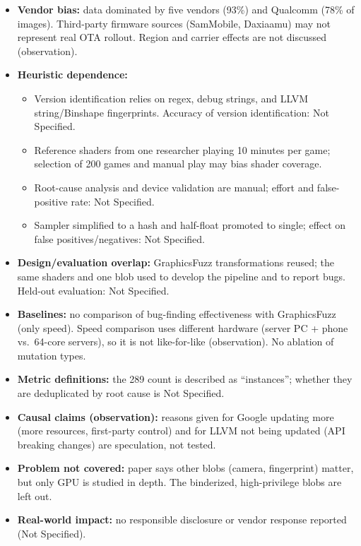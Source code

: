 \documentclass[11pt,a4paper]{article}
\begin{document}
\begin{enumerate}
\begin{itemize}[leftmargin=*, itemsep=1pt, topsep=2pt]
        \item \textbf{Vendor bias:} data dominated by five vendors (93\%) and Qualcomm (78\% of images). Third-party firmware sources (SamMobile, Daxiaamu) may not represent real OTA rollout. Region and carrier effects are not discussed (observation).
        \item \textbf{Heuristic dependence:}
        \begin{itemize}[itemsep=0pt]
            \item Version identification relies on regex, debug strings, and LLVM string/Binshape fingerprints. Accuracy of version identification: Not Specified.
            \item Reference shaders from one researcher playing 10 minutes per game; selection of 200 games and manual play may bias shader coverage.
            \item Root-cause analysis and device validation are manual; effort and false-positive rate: Not Specified.
            \item Sampler simplified to a hash and half-float promoted to single; effect on false positives/negatives: Not Specified.
        \end{itemize}
        \item \textbf{Design/evaluation overlap:} GraphicsFuzz transformations reused; the same shaders and one blob used to develop the pipeline and to report bugs. Held-out evaluation: Not Specified.
        \item \textbf{Baselines:} no comparison of bug-finding effectiveness with GraphicsFuzz (only speed). Speed comparison uses different hardware (server PC + phone vs.\ 64-core servers), so it is not like-for-like (observation). No ablation of mutation types.
        \item \textbf{Metric definitions:} the 289 count is described as ``instances''; whether they are deduplicated by root cause is Not Specified.
        \item \textbf{Causal claims (observation):} reasons given for Google updating more (more resources, first-party control) and for LLVM not being updated (API breaking changes) are speculation, not tested.
        \item \textbf{Problem not covered:} paper says other blobs (camera, fingerprint) matter, but only GPU is studied in depth. The binderized, high-privilege blobs are left out.
        \item \textbf{Real-world impact:} no responsible disclosure or vendor response reported (Not Specified).
    \end{itemize}


\end{enumerate}
\end{document}
